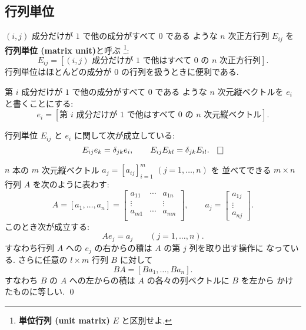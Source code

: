 \documentclass[12pt,twoside]{jarticle}
\begin{document}

\subsection{行列単位}
\label{sec:matrix-unit}

$(i,j)$ 成分だけが $1$ で他の成分がすべて $0$ である
ような $n$ 次正方行列 $E_{ij}$ を{\bf 行列単位 (matrix unit)}と呼ぶ%
\footnote{{\bf 単位行列 (unit matrix)} $E$ と区別せよ.}:
\begin{equation*}
  E_{ij} = [\text{$(i,j)$ 成分だけが $1$ で他はすべて $0$ の $n$ 次正方行列}].
\end{equation*}
行列単位はほとんどの成分が $0$ の行列を扱うときに便利である.

第 $i$ 成分だけが $1$ で他の成分がすべて $0$ である
ような $n$ 次元縦ベクトルを $e_i$ と書くことにする:
\begin{equation*}
  e_i = [\text{第 $i$ 成分だけが $1$ で他はすべて $0$ の $n$ 次元縦ベクトル}].
\end{equation*}

\begin{question}
  行列単位 $E_{ij}$ と $e_i$ に関して次が成立している:
  \begin{equation*}
    E_{ij}e_k = \delta_{jk}e_i, \qquad
    E_{ij}E_{kl} = \delta_{jk}E_{il}.
    \qed
  \end{equation*}
\end{question}

\begin{question}
  $n$ 本の $m$ 次元縦ベクトル $a_j=[a_{ij}]_{i=1}^m$ $(j=1,\ldots,n)$ を
  並べてできる $m\times n$ 行列 $A$ を次のように表わす:
  \begin{equation*}
    A = [a_1,\ldots,a_n] =
    \begin{bmatrix}
      a_{11} & \cdots & a_{1n} \\
      \vdots &        & \vdots \\
      a_{m1} & \cdots & a_{mn} \\
    \end{bmatrix},
    \qquad
    a_j =
    \begin{bmatrix}
      a_{1j} \\ \vdots \\ a_{nj}
    \end{bmatrix}.
  \end{equation*}
  このとき次が成立する:
  \begin{equation*}
    A e_j = a_j \qquad (j=1,\ldots,n).
  \end{equation*}
  すなわち行列 $A$ への $e_j$ の右からの積は $A$ の第 $j$ 列を取り出す操作に
  なっている. さらに任意の $l\times m$ 行列 $B$ に対して
  \begin{equation*}
    B A = [Ba_1, \ldots, Ba_n].
  \end{equation*}
  すなわち $B$ の $A$ への左からの積は $A$ の各々の列ベクトルに $B$ を左から
  かけたものに等しい. \qed
\end{question}
\end{document}
